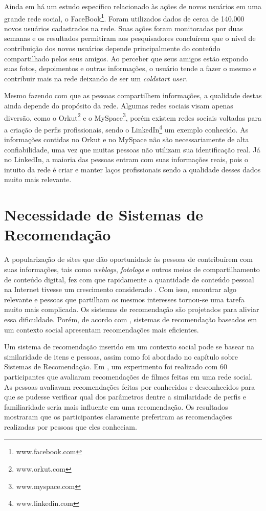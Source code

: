 Ainda em \cite{burke2009fmm} há um estudo específico relacionado às ações de novos usuários em uma grande rede social, o FaceBook\footnote{www.facebook.com}. Foram utilizados dados de cerca de 140.000 novos usuários cadastrados na rede. Suas ações foram monitoradas por duas semanas e os resultados permitiram aos pesquisadores concluírem que o nível de contribuição dos novos usuários depende principalmente do conteúdo compartilhado pelos seus amigos. Ao perceber que seus amigos estão expondo suas fotos, depoimentos e outras informações, o usuário tende a fazer o mesmo e contribuir mais na rede deixando de ser um \textit{coldstart user}.

Mesmo fazendo com que as pessoas compartilhem informações, a qualidade destas ainda depende do propósito da rede. Algumas redes sociais visam apenas diversão, como o Orkut\footnote{www.orkut.com} e o MySpace\footnote{www.myspace.com}, porém existem redes sociais voltadas para a criação de perfis profissionais, sendo o LinkedIn\footnote{www.linkedin.com} um exemplo conhecido. As informações contidas no Orkut e no MySpace não são necessariamente de alta confiabilidade, uma vez que muitas pessoas não utilizam sua identificação real. Já no LinkedIn, a maioria das pessoas entram com suas informações reais, pois o intuito da rede é criar e manter laços profissionais sendo a qualidade desses dados muito mais relevante.

\section{Necessidade de Sistemas de Recomendação}

A popularização de sites que dão oportunidade às pessoas de contribuírem com suas informações, tais como \textit{weblogs}, \textit{fotologs} e outros meios de compartilhamento de conteúdo digital, fez com que rapidamente a quantidade de conteúdo pessoal na Internet tivesse um crescimento considerado \cite{bonhard2007devil}. Com isso, encontrar algo relevante e pessoas que partilham os mesmos interesses tornou-se uma tarefa muito mais complicada. Os sistemas de recomendação são projetados para aliviar essa dificuldade. Porém, de acordo com \cite{bonhard2007devil}, sistemas de recomendação baseados em um contexto social apresentam recomendações mais eficientes.

Um sistema de recomendação inserido em um contexto social pode se basear na similaridade de itens e pessoas, assim como foi abordado no capítulo sobre Sistemas de Recomendação. Em \cite{bonhard2007devil}, um experimento foi realizado com 60 participantes que avaliaram recomendações de filmes feitas em uma rede social. As pessoas avaliavam recomendações feitas por conhecidos e desconhecidos para que se pudesse verificar qual dos parâmetros dentre a similaridade de perfis e familiaridade seria mais influente em uma recomendação. Os resultados mostraram que os participantes claramente preferiram as recomendações realizadas por pessoas que eles conheciam.



